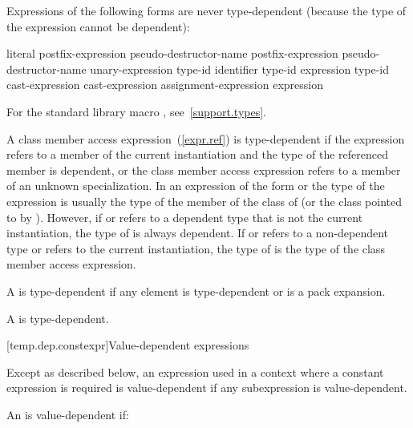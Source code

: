 \pnum
Expressions of the following forms are never type-dependent (because the type
of the expression cannot be dependent):

\begin{ncbnftab}
literal\br
postfix-expression  pseudo-destructor-name\br
postfix-expression \terminal{->} pseudo-destructor-name\br
{} unary-expression\br
{} type-id \terminal{)}\br
{}  \terminal{(} identifier \terminal{)}\br
{} type-id \terminal{)}\br
{} expression \terminal{)}\br
{} type-id \terminal{)}\br
{} cast-expression\br
{} cast-expression\br
{} assignment-expression\opt\br
{} \terminal{(} expression \terminal{)}
\end{ncbnftab}

\enternote For the standard library macro ,
see~\ref{support.types}.\exitnote

\pnum
A class member access expression~(\ref{expr.ref}) is
type-dependent if
the expression refers to a member of the current instantiation and
the type of the referenced member is dependent, or the class member access
expression refers to a member of an unknown specialization.
\enternote
In an expression of the form
or
the type of the expression is usually the type of the member
of the class of
(or the class pointed to by
).
However, if
or
refers to a dependent type that is not the current instantiation,
the type of
is always dependent. If
or 
refers to a non-dependent type or refers to the current instantiation, the
type of
is the type of the class member access expression.
\exitnote

\pnum
A  is type-dependent if any element is
type-dependent or is a pack expansion.

\pnum
A  is type-dependent.

[temp.dep.constexpr]{Value-dependent expressions}

\pnum
Except as described below, an expression used in a context where a
constant expression is required is value-dependent if any
subexpression is value-dependent.

\pnum
An
is value-dependent if:


